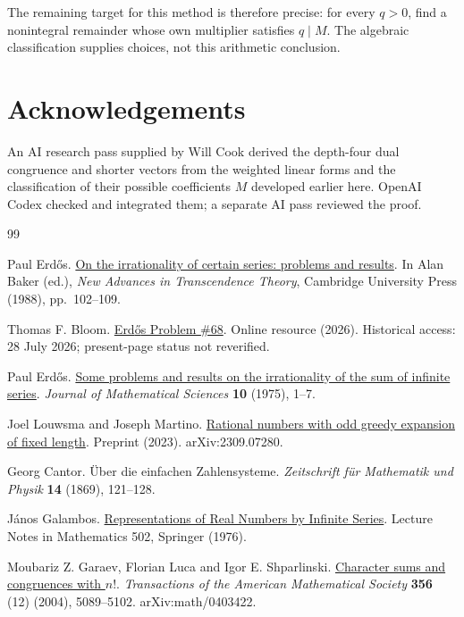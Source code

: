 The remaining target for this method is therefore precise: for every
$q>0$, find a nonintegral remainder whose own multiplier satisfies
$q\mid M$. The algebraic classification supplies choices, not this
arithmetic conclusion.

\section*{Acknowledgements}

An AI research pass supplied by Will Cook derived the depth-four dual
congruence and shorter vectors from the weighted linear forms and the
classification of their possible coefficients $M$ developed earlier here. OpenAI Codex
checked and integrated them; a separate AI pass reviewed the proof.

\begin{thebibliography}{99}

Paul Erd{\H o}s. \href{https://doi.org/10.1017/CBO9780511897184.009}{On the irrationality of certain series: problems and results}.
In Alan Baker (ed.), \emph{New Advances in Transcendence Theory}, Cambridge University Press (1988), pp.~102--109.

Thomas F. Bloom. \href{https://www.erdosproblems.com/68}{Erd{\H o}s Problem {\#68}}.
Online resource (2026). Historical access: 28 July 2026; present-page status not reverified.

Paul Erd{\H o}s. \href{https://www.renyi.hu/~p_erdos/1976-44.pdf}{Some problems and results on the irrationality of the sum of infinite series}.
\emph{Journal of Mathematical Sciences} \textbf{10} (1975), 1--7.

Joel Louwsma and Joseph Martino. \href{https://arxiv.org/abs/2309.07280v1}{Rational numbers with odd greedy expansion of fixed length}.
Preprint (2023). arXiv:2309.07280.

Georg Cantor. {\"U}ber die einfachen Zahlensysteme.
\emph{Zeitschrift f{\"u}r Mathematik und Physik} \textbf{14} (1869), 121--128.

J{\'a}nos Galambos. \href{https://doi.org/10.1007/BFb0081642}{Representations of Real Numbers by Infinite Series}.
Lecture Notes in Mathematics 502, Springer (1976).

Moubariz Z. Garaev, Florian Luca and Igor E. Shparlinski. \href{https://doi.org/10.1090/S0002-9947-04-03612-8}{Character sums and congruences with {$n!$}}.
\emph{Transactions of the American Mathematical Society} \textbf{356} (12) (2004), 5089--5102. arXiv:math/0403422.


\end{thebibliography}
